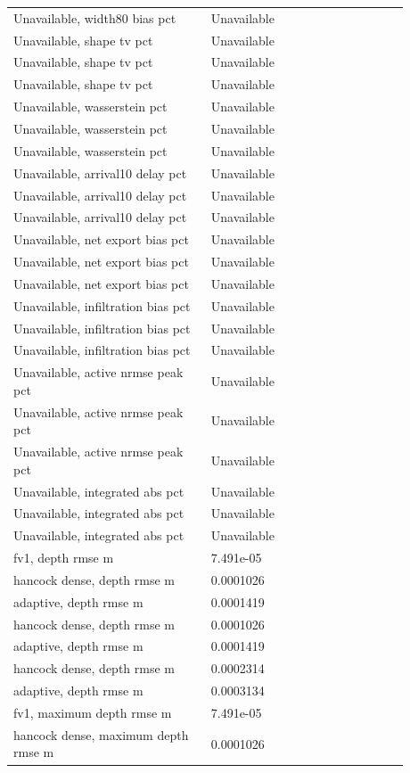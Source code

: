 \begin{longtable}{p{0.4400\linewidth}p{0.4400\linewidth}}
Unavailable, width80 bias pct & Unavailable \\
Unavailable, shape tv pct & Unavailable \\
Unavailable, shape tv pct & Unavailable \\
Unavailable, shape tv pct & Unavailable \\
Unavailable, wasserstein pct & Unavailable \\
Unavailable, wasserstein pct & Unavailable \\
Unavailable, wasserstein pct & Unavailable \\
Unavailable, arrival10 delay pct & Unavailable \\
Unavailable, arrival10 delay pct & Unavailable \\
Unavailable, arrival10 delay pct & Unavailable \\
Unavailable, net export bias pct & Unavailable \\
Unavailable, net export bias pct & Unavailable \\
Unavailable, net export bias pct & Unavailable \\
Unavailable, infiltration bias pct & Unavailable \\
Unavailable, infiltration bias pct & Unavailable \\
Unavailable, infiltration bias pct & Unavailable \\
Unavailable, active nrmse peak pct & Unavailable \\
Unavailable, active nrmse peak pct & Unavailable \\
Unavailable, active nrmse peak pct & Unavailable \\
Unavailable, integrated abs pct & Unavailable \\
Unavailable, integrated abs pct & Unavailable \\
Unavailable, integrated abs pct & Unavailable \\
fv1, depth rmse m & 7.491e-05 \\
hancock dense, depth rmse m & 0.0001026 \\
adaptive, depth rmse m & 0.0001419 \\
hancock dense, depth rmse m & 0.0001026 \\
adaptive, depth rmse m & 0.0001419 \\
hancock dense, depth rmse m & 0.0002314 \\
adaptive, depth rmse m & 0.0003134 \\
fv1, maximum depth rmse m & 7.491e-05 \\
hancock dense, maximum depth rmse m & 0.0001026 \\

\end{longtable}
